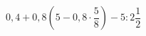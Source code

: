 \begin{ex}[type=calculate]
	\begin{condition}
		\( 0,4+0,8\left( 5-0,8\cdot\dfrac{5}{8} \right)-5:2\dfrac{1}{2} \)
	\end{condition}
\end{ex}
